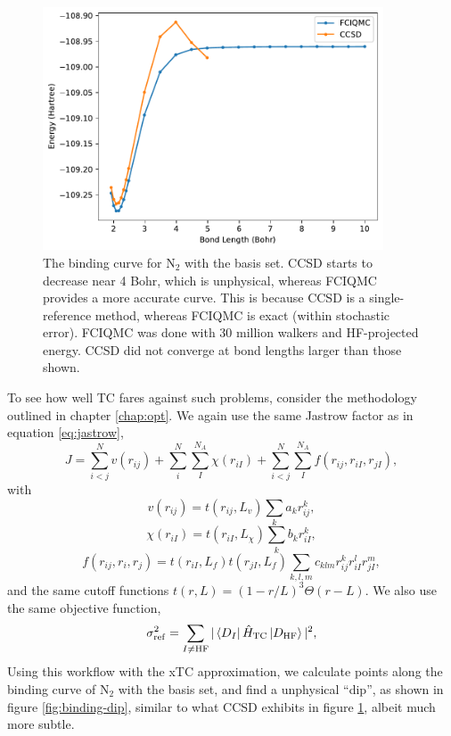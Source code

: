 \begin{figure}[htbp]
    \centering
    \includegraphics[width=0.9\textwidth]{figures/binding/N2_vdz_nontc}
    \caption{The binding curve for N$_2$ with the \vdz basis set. CCSD starts to decrease near 4 Bohr, which is unphysical, whereas FCIQMC provides a more accurate curve. This is because CCSD is a single-reference method, whereas FCIQMC is exact (within stochastic error). FCIQMC was done with 30 million walkers and HF-projected energy. CCSD did not converge at bond lengths larger than those shown.}
    \label{fig:ccsd-vs-fciqmc-n2}
\end{figure}

To see how well TC fares against such problems, consider the methodology outlined in chapter \ref{chap:opt}. We again use the same Jastrow factor as in equation \ref{eq:jastrow},
\begin{equation}
    \label{eq:jastrow-again}
    J = \sum_{i<j}^Nv(r_{ij}) + \sum_i^N\sum_I^{N_A}\chi(r_{iI}) + \sum_{i<j}^N\sum_I^{N_A}f(r_{ij}, r_{iI}, r_{jI}),
\end{equation}
with
\begin{equation}
    \label{eq:dtn-jastrow-ee-2}
    v(r_{ij})    = t(r_{ij},L_v)
                    \sum_{k} a_k r_{ij}^k ,
\end{equation}
\begin{equation}
    \label{eq:dtn-jastrow-en-2}
    \chi(r_{iI}) = t(r_{iI},L_\chi)
    \sum_{k} b_k r_{iI}^k ,
\end{equation}
\begin{equation}
    \label{eq:dtn-jastrow-een-2}
    f(r_{ij}, r_{i}, r_{j}) = t(r_{iI},L_f) t(r_{jI},L_f)
    \sum_{k,l,m} c_{klm}
    r_{ij}^k r_{iI}^l r_{jI}^m ,
\end{equation}
and the same cutoff functions $t(r,L) = (1-r/L)^3
\Theta(r-L)$. We also use the same objective function,
\begin{equation}
    \label{eq:varref-hf}
    \sigma_\mathrm{ref}^2 = \sum_{I\neq \mathrm{HF}}|\bra{D_I}\hat H_\mathrm{TC}\ket{D_\mathrm{HF}}|^2,
\end{equation}
Using this workflow with the xTC approximation, we calculate points along the binding curve of N$_2$ with the \avtz basis set, and find a unphysical ``dip'', as shown in figure \ref{fig:binding-dip}, similar to what CCSD exhibits in figure \ref{fig:ccsd-vs-fciqmc-n2}, albeit much more subtle.

